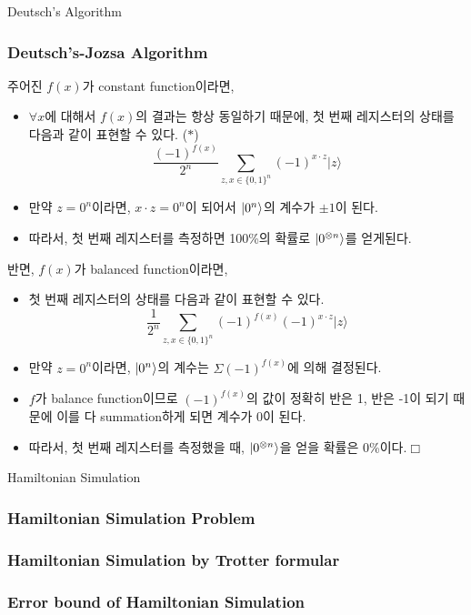 \documentclass[9pt]{beamer}
\begin{document}
\begin{section}{Deutsch's Algorithm}
        \begin{frame}
            \frametitle{Deutsch's-Jozsa Algorithm}
            주어진 $f(x)$가 constant function이라면,
            \begin{itemize}
                \item  $\forall x$에 대해서 $f(x)$의 결과는 항상 동일하기 때문에, 첫 번째 레지스터의 상태를 다음과 같이 표현할 수 있다. ($\ast$)
                $$ \frac{(-1)^{f(x)}}{2^n} \sum_{z, x \in\{0,1\}^n} {(-1)^{x \cdot z}|z\rangle}    $$
                \item 만약 $z = 0^n$이라면, $x \cdot z = 0^n$이 되어서 $\ket{0^n}$의 계수가 $\pm 1$이 된다.
                \item 따라서, 첫 번째 레지스터를 측정하면 100\%의 확률로 $\ket{0^{\otimes n}}$를 얻게된다.
            \end{itemize}
            \vspace{0.2cm}
            반면, $f(x)$가 balanced function이라면,
            \begin{itemize}
                \item 첫 번째 레지스터의 상태를 다음과 같이 표현할 수 있다.
                $$ \frac{1}{2^n} \sum_{z, x \in\{0,1\}^n} {(-1)^{f(x)}(-1)^{x \cdot z}|z\rangle}  $$
                \item 만약 $z = 0^n$이라면, $\ket{0^n}$의 계수는 $\Sigma (-1)^{f(x)}$에 의해 결정된다.
                \item $f$가 balance function이므로 $(-1)^{f(x)}$의 값이 정확히 반은 1, 반은 -1이 되기 때문에 이를 다 summation하게 되면 계수가 $0$이 된다.
                \item 따라서, 첫 번째 레지스터를 측정했을 때, $\ket{0^{\otimes n}}$을 얻을 확률은 0\%이다.$\Box$
            \end{itemize}
        \end{frame}
    \end{section}

    \begin{section}{Hamiltonian Simulation}
        \begin{frame}
            \frametitle{Hamiltonian Simulation Problem}
            
        \end{frame}

        \begin{frame}
            \frametitle{Hamiltonian Simulation by Trotter formular}
            
        \end{frame}

        \begin{frame}
            \frametitle{Error bound of Hamiltonian Simulation}
            
        \end{frame}
    \end{section}
\end{document}

